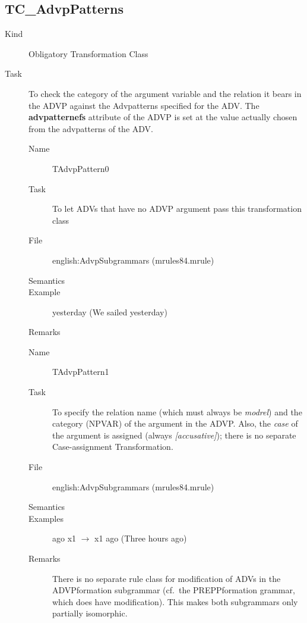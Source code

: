 \subsection{TC\_AdvpPatterns}
\begin{description}
\item[Kind] Obligatory Transformation Class
\item[Task] To check the category of the argument variable and the relation 
it bears in the ADVP against the Advpatterns specified for the ADV. The {\bf 
advpatternefs} attribute of the ADVP is set at the value 
actually chosen from the advpatterns of the ADV.

\vspace{1 cm}
\begin{description}
\item[Name] TAdvpPattern0
\item[Task] To let ADVs that have no ADVP argument pass this transformation 
class
\item[File] english:AdvpSubgrammars (mrules84.mrule)
\item[Semantics]
\item[Example] yesterday (We sailed yesterday)
\item[Remarks]
\end{description}

\vspace{1 cm}
\begin{description}
\item[Name] TAdvpPattern1
\item[Task] To specify the relation name (which must always be {\em modrel\/})
and the category (NPVAR) of the argument in the ADVP. Also, the {\em case\/} of 
the argument is assigned (always {\em [accusative]\/}); there is no 
separate Case-assignment Transformation.
\item[File] english:AdvpSubgrammars (mrules84.mrule)
\item[Semantics]
\item[Examples] ago x1 $\rightarrow$ x1 ago (Three hours ago)
\item[Remarks] There is no separate rule class for modification of ADVs in the 
ADVPformation subgrammar (cf.\ the PREPPformation grammar, which does have 
modification). This makes both subgrammars only partially isomorphic.
\end{description}

\end{description}

\newpage
